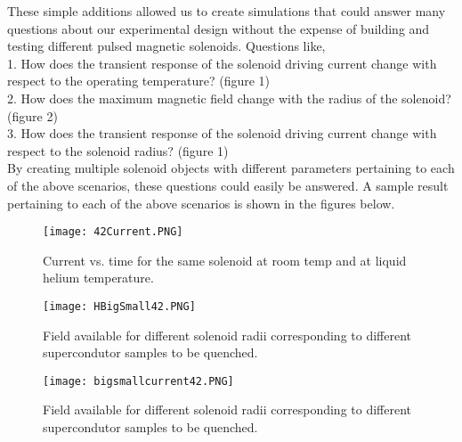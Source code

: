 \documentclass[prb,preprint]{revtex4-1}
\begin{document}
These simple additions allowed us to create simulations that could answer many questions about our experimental design without the expense of building and testing different pulsed magnetic solenoids.  Questions like, 
\\
1.  How does the transient response of the solenoid driving current change with respect to the operating temperature? (figure 1) 
\\
2.  How does the maximum magnetic field change with the radius of the solenoid? (figure 2) 
\\
3.  How does the transient response of the solenoid driving current change with respect to the solenoid radius? (figure 1) 
\\
By creating multiple solenoid objects with different parameters pertaining to each of the above scenarios, these questions could easily be answered.  A sample result pertaining to each of the above scenarios is shown in the figures below.

\begin{figure}[page]
\centering
\texttt{[image: 42Current.PNG]}
\caption{Current vs. time for the same solenoid at room temp and at liquid helium temperature.}
\label{sunsets}
\end{figure}
\begin{figure}[h!]
\centering
\texttt{[image: HBigSmall42.PNG]}
\caption{Field available for different solenoid radii corresponding to different supercondutor samples to be quenched.}
\label{sunsets}
\end{figure}
\begin{figure}[h!]
\centering
\texttt{[image: bigsmallcurrent42.PNG]}
\caption{Field available for different solenoid radii corresponding to different supercondutor samples to be quenched.}
\label{sunsets}
\end{figure}
\end{document}

